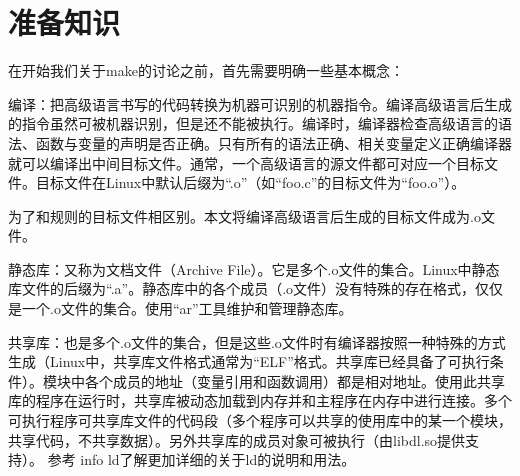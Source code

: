 \section{准备知识}
在开始我们关于make的讨论之前，首先需要明确一些基本概念：


编译：把高级语言书写的代码转换为机器可识别的机器指令。编译高级语言后生成的指令虽然可被机器识别，但是还不能被执行。编译时，编译器检查高级语言的语法、函数与变量的声明是否正确。只有所有的语法正确、相关变量定义正确编译器就可以编译出中间目标文件。通常，一个高级语言的源文件都可对应一个目标文件。目标文件在Linux中默认后缀为“.o”（如“foo.c”的目标文件为“foo.o”）。


为了和规则的目标文件相区别。本文将编译高级语言后生成的目标文件成为.o文件。


静态库：又称为文档文件（Archive File）。它是多个.o文件的集合。Linux中静态库文件的后缀为“.a”。静态库中的各个成员（.o文件）没有特殊的存在格式，仅仅是一个.o文件的集合。使用“ar”工具维护和管理静态库。

共享库：也是多个.o文件的集合，但是这些.o文件时有编译器按照一种特殊的方式生成（Linux中，共享库文件格式通常为“ELF”格式。共享库已经具备了可执行条件）。模块中各个成员的地址（变量引用和函数调用）都是相对地址。使用此共享库的程序在运行时，共享库被动态加载到内存并和主程序在内存中进行连接。多个可执行程序可共享库文件的代码段（多个程序可以共享的使用库中的某一个模块，共享代码，不共享数据）。另外共享库的成员对象可被执行（由libdl.so提供支持）。
参考 info ld了解更加详细的关于ld的说明和用法。
